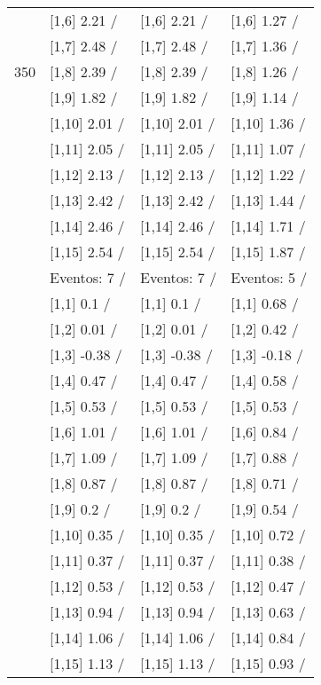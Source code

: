 \begin{table}
\begin{tabular}[t]{llll}
 & {}[1,6] 2.21  / & {}[1,6] 2.21  / & {}[1,6] 1.27  /\\
 & {}[1,7] 2.48  / & {}[1,7] 2.48  / & {}[1,7] 1.36  /\\
350 & {}[1,8] 2.39  / & {}[1,8] 2.39  / & {}[1,8] 1.26  /\\
\addlinespace
 & {}[1,9] 1.82  / & {}[1,9] 1.82  / & {}[1,9] 1.14  /\\
 & {}[1,10] 2.01  / & {}[1,10] 2.01  / & {}[1,10] 1.36  /\\
 & {}[1,11] 2.05  / & {}[1,11] 2.05  / & {}[1,11] 1.07  /\\
 & {}[1,12] 2.13  / & {}[1,12] 2.13  / & {}[1,12] 1.22  /\\
 & {}[1,13] 2.42  / & {}[1,13] 2.42  / & {}[1,13] 1.44  /\\
\addlinespace
 & {}[1,14] 2.46  / & {}[1,14] 2.46  / & {}[1,14] 1.71  /\\
 & {}[1,15] 2.54  / & {}[1,15] 2.54  / & {}[1,15] 1.87  /\\
 & Eventos:  7 / & Eventos:  7 / & Eventos:  5 /\\
 & {}[1,1] 0.1  / & {}[1,1] 0.1  / & {}[1,1] 0.68  /\\
 & {}[1,2] 0.01  / & {}[1,2] 0.01  / & {}[1,2] 0.42  /\\
\addlinespace
 & {}[1,3] -0.38  / & {}[1,3] -0.38  / & {}[1,3] -0.18  /\\
 & {}[1,4] 0.47  / & {}[1,4] 0.47  / & {}[1,4] 0.58  /\\
 & {}[1,5] 0.53  / & {}[1,5] 0.53  / & {}[1,5] 0.53  /\\
 & {}[1,6] 1.01  / & {}[1,6] 1.01  / & {}[1,6] 0.84  /\\
 & {}[1,7] 1.09  / & {}[1,7] 1.09  / & {}[1,7] 0.88  /\\
\addlinespace
500 & {}[1,8] 0.87  / & {}[1,8] 0.87  / & {}[1,8] 0.71  /\\
 & {}[1,9] 0.2  / & {}[1,9] 0.2  / & {}[1,9] 0.54  /\\
 & {}[1,10] 0.35  / & {}[1,10] 0.35  / & {}[1,10] 0.72  /\\
 & {}[1,11] 0.37  / & {}[1,11] 0.37  / & {}[1,11] 0.38  /\\
 & {}[1,12] 0.53  / & {}[1,12] 0.53  / & {}[1,12] 0.47  /\\
\addlinespace
 & {}[1,13] 0.94  / & {}[1,13] 0.94  / & {}[1,13] 0.63  /\\
 & {}[1,14] 1.06  / & {}[1,14] 1.06  / & {}[1,14] 0.84  /\\
 & {}[1,15] 1.13  / & {}[1,15] 1.13  / & {}[1,15] 0.93  /\\
\bottomrule
\end{tabular}
\end{table}
